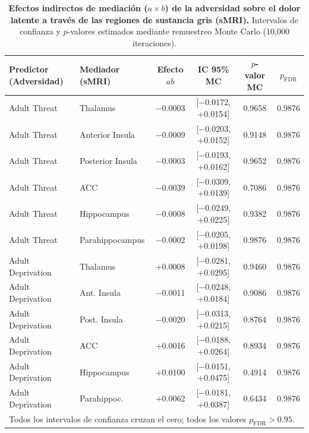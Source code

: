 \documentclass[11pt,a4paper]{article}
\begin{document}
\begin{table}[htbp]
\centering
\small
\caption{\textbf{Efectos indirectos de mediación ($a \times b$) de la adversidad sobre el dolor latente a través de las regiones de sustancia gris (sMRI).} Intervalos de confianza y $p$-valores estimados mediante remuestreo 
Monte Carlo (10,000 iteraciones).}
\label{tab:monte_carlo_indirects}
\begin{tabular}{llcccc}
\toprule
\textbf{Predictor (Adversidad)} & \textbf{Mediador (sMRI)} & \textbf{Efecto $ab$} & \textbf{IC 95\% MC} & \textbf{$p$-valor MC} & \textbf{$p_{\text{FDR}}$} \\
\midrule
Adult Threat & Thalamus          & $-$0.0003 & [$-$0.0172, +0.0154] & 0.9658 & 0.9876 \\
Adult Threat & Anterior Insula   & $-$0.0009 & [$-$0.0203, +0.0152] & 0.9148 & 0.9876 \\
Adult Threat & Posterior Insula  & $-$0.0003 & [$-$0.0193, +0.0162] & 0.9652 & 0.9876 \\
Adult Threat & ACC               & $-$0.0039 & [$-$0.0309, +0.0139] & 0.7086 & 0.9876 \\
Adult Threat & Hippocampus       & $-$0.0008 & [$-$0.0249, +0.0225] & 0.9382 & 0.9876 \\
Adult Threat & Parahippocampus   & $-$0.0002 & [$-$0.0205, +0.0198] & 0.9876 & 0.9876 \\
\midrule
Adult Deprivation & Thalamus     & +0.0008 & [$-$0.0281, +0.0295] & 0.9460 & 0.9876 \\
Adult Deprivation & Ant. Insula  & $-$0.0011 & [$-$0.0248, +0.0184] & 0.9086 & 0.9876 \\
Adult Deprivation & Post. Insula & $-$0.0020 & [$-$0.0313, +0.0215] & 0.8764 & 0.9876 \\
Adult Deprivation & ACC          & +0.0016 & [$-$0.0188, +0.0264] & 0.8934 & 0.9876 \\
Adult Deprivation & Hippocampus  & +0.0100 & [$-$0.0151, +0.0475] & 0.4914 & 0.9876 \\
Adult Deprivation & Parahippoc.  & +0.0062 & [$-$0.0181, +0.0387] & 0.6434 & 0.9876 \\
\bottomrule
\multicolumn{6}{l}{\footnotesize Todos los intervalos de confianza cruzan el cero; todos los valores $p_{\text{FDR}} > 0.95$.}
\end{tabular}
\end{table}
\end{document}
